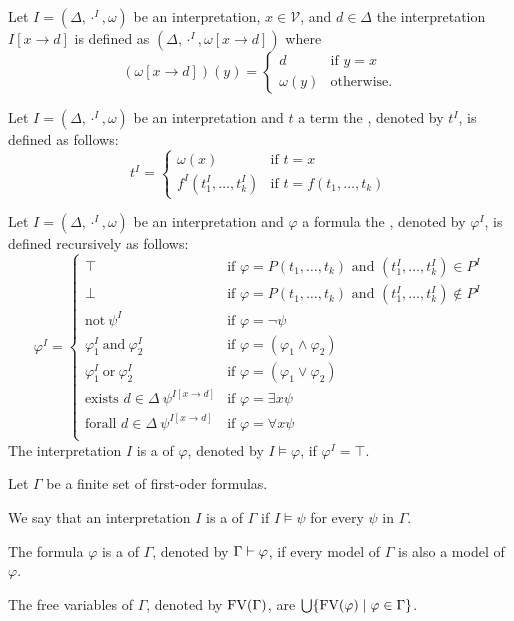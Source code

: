 Let $I=(\Delta,\cdot^I,\omega)$ be an interpretation, $x\in\mathcal{V}$, and $d\in\Delta$ the interpretation $I\left[x\to d\right]$ is defined as $(\Delta,\cdot^I,\omega\left[x\to d\right])$ where
\[(\omega\left[x\to d\right])(y)=
\begin{cases}
d & \text{if $y=x$}\\
\omega(y) & \text{otherwise.}
\end{cases}\]
\begin{definition}
Let $I=(\Delta,\cdot^I,\omega)$ be an interpretation and $t$ a term the , denoted by $t^I$, is defined as follows:
\[t^I=
\begin{cases}
\omega(x) & \text{if $t=x$}\\
f^I(t^I_1,\dots,t^I_k) & \text{if $t=f(t_1,\dots,t_k)$}
\end{cases}\]
\end{definition}
\begin{definition}
Let $I=(\Delta,\cdot^I,\omega)$ be an interpretation and $\varphi$ a formula the , denoted by $\varphi^I$, is defined recursively as follows:
\[\varphi^I=
\begin{cases}
\top & \text{if $\varphi=P(t_1,\dots,t_k)$ and $(t^I_1,\dots,t^I_k)\in P^I$}\\
\bot & \text{if $\varphi=P(t_1,\dots,t_k)$ and $(t^I_1,\dots,t^I_k)\notin P^I$}\\
\text{not}~\psi^I & \text{if $\varphi=\neg\psi$}\\
\varphi^I_1~\text{and}~\varphi^I_2 & \text{if $\varphi=(\varphi_1\wedge\varphi_2)$}\\
\varphi^I_1~\text{or}~\varphi^I_2 & \text{if $\varphi=(\varphi_1\vee\varphi_2)$}\\
\text{exists $d\in\Delta$}~\psi^{I\left[x\to d\right]} & \text{if $\varphi=\exists x\psi$}\\
\text{forall $d\in\Delta$}~\psi^{I\left[x\to d\right]} & \text{if $\varphi=\forall x\psi$}\\
\end{cases}\]
The interpretation $I$ is a  of $\varphi$, denoted by $I\models\varphi$, if $\varphi^I=\top$.
\end{definition}
\begin{definition} %
Let $\Gamma$ be a finite set of first-oder formulas.
\begin{description}
\item We say that an interpretation $I$ is a  of $\Gamma$ if $I\models\psi$ for every $\psi$ in $\Gamma$.
\item The formula $\varphi$ is a  of $\Gamma$, denoted by $\Gamma\vdash\varphi$, if every model of $\Gamma$ is also a model of $\varphi$.
\item The free variables of $\Gamma$, denoted by $\text{FV}(\Gamma)$, are $\bigcup\{\text{FV}(\varphi)\mid \varphi\in \Gamma\}$.
\end{description}
\end{definition}

